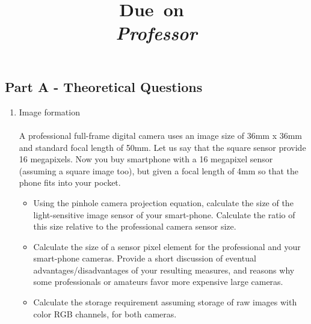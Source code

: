 \documentclass{article}
\title{
    \vspace{2in}
    \textmd{\textbf{\hmwkClass\\\hmwkTitle}}\\
    \normalsize\vspace{0.1in}\small{Due\ on\ \hmwkDueDate}\\
    \vspace{0.1in}\large{\textit{Professor \hmwkClassInstructor}}
    \vspace{3in}
}
\author{\hmwkAuthorName}
\date{}
\begin{document}
\maketitle
\pagebreak

\subsection{Part A - Theoretical Questions}
\begin{enumerate}[label=A\arabic*)]
	\item Image formation 
		\\
		\\
		A professional full-frame digital camera uses an image size of 36mm x 36mm and standard focal length of 50mm. Let us say that the square sensor provide 16 megapixels. Now you buy smartphone with a 16 megapixel sensor (assuming a square image too), but given a focal length of 4mm so that the phone fits into your pocket.
		\begin{itemize}
			\item Using the pinhole camera projection equation, calculate the size of the light-sensitive image sensor of your smart-phone. Calculate the ratio of this size relative to the professional camera sensor size.
			\item Calculate the size of a sensor pixel element for the professional and your smart-phone cameras. Provide a short discussion of eventual advantages/disadvantages of your resulting measures, and reasons why some professionals or amateurs favor more expensive large cameras.
			\item Calculate the storage requirement assuming storage of raw images with color RGB channels, for both cameras.	
		\end{itemize}


\end{enumerate}
\end{document}
